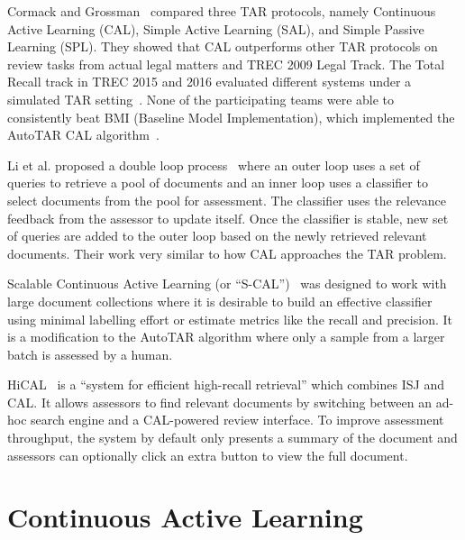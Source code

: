 Cormack and Grossman~\cite{cormack2014evaluation} compared three TAR protocols,
namely Continuous Active Learning (CAL), Simple Active Learning (SAL), and
Simple Passive Learning (SPL). They showed that CAL outperforms other TAR
protocols on review tasks from actual legal matters and TREC 2009 Legal Track.
The Total Recall track in TREC 2015 and 2016 evaluated different systems under a
simulated TAR setting~\cite{grossman2016trec,roegiest2015trec}. None of the
participating teams were able to consistently beat BMI (Baseline Model
Implementation), which implemented the AutoTAR CAL
algorithm~\cite{cormack2015autonomy}.

Li et al. proposed a double loop process~\cite{li2014req} where an outer loop uses a set of
queries to retrieve a pool of documents and an inner loop uses a classifier to
select documents from the pool for assessment. The classifier uses the relevance
feedback from the assessor to update itself. Once the classifier is stable, new
set of queries are added to the outer loop based on the newly retrieved relevant
documents. Their work very similar to how CAL approaches the TAR problem.

Scalable Continuous Active Learning (or ``S-CAL'')~\cite{cormack2016scalability}
was designed to work with large document collections where it is desirable to
build an effective classifier using minimal labelling effort or estimate metrics
like the recall and precision. It is a modification to the AutoTAR algorithm
where only a sample from a larger batch is assessed by a human.

HiCAL~\cite{sigirdemo} is a ``system for efficient high-recall retrieval'' which
combines ISJ and CAL. It allows assessors to find relevant documents by
switching between an ad-hoc search engine and a CAL-powered review interface.
To improve assessment throughput, the system by default only presents a summary
of the document and assessors can optionally click an extra button to view the
full document.

\section{Continuous Active Learning}
\label{sec:cal}

